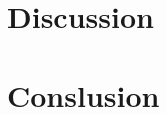 \documentclass[12pt]{extarticle}
\begin{document}
\section{Discussion}
\section{Conslusion}




\printbibliography
\end{document}
